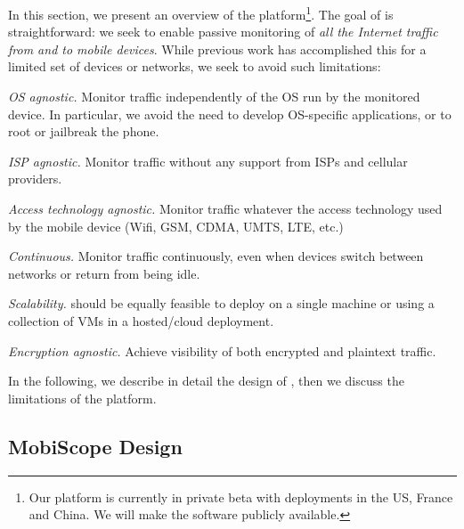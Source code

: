 In this section, we present an overview of the \platname{} platform\footnote{Our platform is currently in private beta with deployments in the US, France and China. We will make the \platname{} software publicly available.}. The goal of \platname{} is straightforward: we 
 seek to enable passive monitoring of \emph{all
  the Internet traffic from and to mobile devices}. While previous work has accomplished 
  this for a limited set of devices or networks, we seek to avoid such limitations: 
\begin{packedenumerate}
\item \emph{OS agnostic.} Monitor traffic independently of
  the OS run by the monitored device. In particular, we avoid the need to 
  develop OS-specific applications, or to root or jailbreak the phone.
\item \emph{ISP agnostic.} Monitor traffic without any
  support from ISPs and cellular providers.
\item \emph{Access technology agnostic.} Monitor traffic
  whatever the access technology used by the mobile device (Wifi, GSM,
  CDMA, UMTS, LTE, etc.)
\item \emph{Continuous.} Monitor traffic continuously, even when devices switch 
between networks or return from being idle.

\item \emph{Scalability.} \platname{} should be equally feasible to deploy 
on a single machine or using a collection of VMs in a hosted/cloud deployment. 

\item \emph{Encryption agnostic.} Achieve visibility of both encrypted and plaintext traffic.

 \end{packedenumerate}    
 

In the following, we describe in detail the design of \platname{},
then we discuss the limitations of the platform.


\subsection{MobiScope Design}


